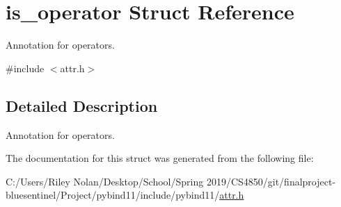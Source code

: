 \hypertarget{structis__operator}{}\section{is\+\_\+operator Struct Reference}
\label{structis__operator}


Annotation for operators.  




{\ttfamily \#include $<$attr.\+h$>$}



\subsection{Detailed Description}
Annotation for operators. 

The documentation for this struct was generated from the following file\+:\begin{DoxyCompactItemize}
\item 
C\+:/\+Users/\+Riley Nolan/\+Desktop/\+School/\+Spring 2019/\+C\+S4850/git/finalproject-\/bluesentinel/\+Project/pybind11/include/pybind11/\mbox{\hyperlink{attr_8h}{attr.\+h}}\end{DoxyCompactItemize}
